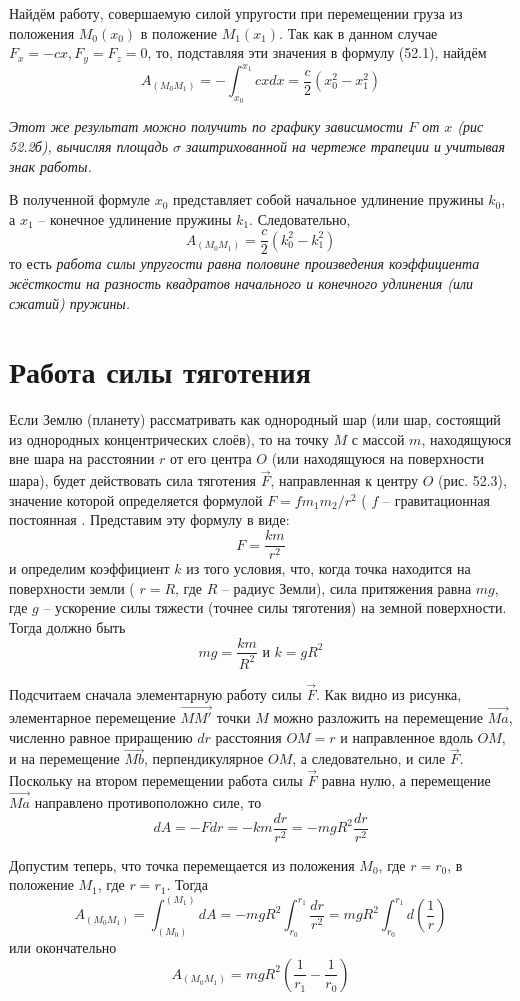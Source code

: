 Найдём работу, совершаемую силой упругости при перемещении груза из 
положения \( M_0(x_0) \) в положение \( M_1(x_1) \). Так как в данном 
случае \( F_x = -cx, F_y = F_z = 0 \), то, подставляя эти значения в 
формулу (52.1), найдём
\[ 
    A_{(M_0 M_1)} = - \int_{x_0}^{x_1} cxdx = 
    \frac{c}{2} \left( x^{2}_0 - x^{2}_1 \right) 
\]

\emph{Этот же результат можно получить по графику зависимости 
\( F \) от \( x \) (рис 52.2б), вычисляя площадь \( \sigma \) 
заштрихованной на чертеже трапеции и учитывая знак работы.}

В полученной формуле \( x_0 \) представляет собой начальное удлинение 
пружины \( k_0 \), а \( x_1 \) -- конечное удлинение пружины \( k_1 \). 
Следовательно, 
\[ A_{(M_0 M_1)} = \frac{c}{2} \left( k^{2}_0 - k^{2}_1 \right) \]
то есть \emph{работа силы упругости равна половине произведения 
коэффициента жёсткости на разность квадратов начального и конечного 
удлинения (или сжатий) пружины.}

\section{Работа силы тяготения}
Если Землю (планету) рассматривать как однородный шар (или шар, 
состоящий из однородных концентрических слоёв), то на точку \( M \) с 
массой \( m \), находящуюся вне шара на расстоянии \( r \) от его 
центра \( O \) (или находящуюся на поверхности шара), будет действовать 
сила тяготения \( \vec{F} \), направленная к центру \( O \) (рис. 52.3), 
значение которой определяется формулой \( F = fm_1 m_2 / r^2 \) 
( \( f \) -- гравитационная постоянная \). Представим эту формулу в виде: 
\[ F = \frac{km}{r^2} \]
и определим коэффициент \( k \) из того условия, что, когда точка 
находится на поверхности земли ( \( r = R \), где \( R \) -- радиус Земли), 
сила притяжения равна \( mg \), где \( g \) -- ускорение силы тяжести 
(точнее силы тяготения) на земной поверхности. Тогда должно быть
\[ mg = \frac{km}{R^2} \text{ и } k = gR^2 \]

Подсчитаем сначала элементарную работу силы \( \vec{F} \). Как видно из 
рисунка, элементарное перемещение \( \vec{MM'} \) точки \( M \) можно 
разложить на перемещение \( \vec{Ma} \), численно равное приращению 
\( dr \) расстояния \( OM = r \) и направленное вдоль \( OM \), и на 
перемещение \( \vec{Mb} \), перпендикулярное \( OM \), а следовательно, и 
силе \( \vec{F} \). Поскольку на втором перемещении работа силы 
\( \vec{F} \) равна нулю, а перемещение \( \vec{Ma} \) направлено 
противоположно силе, то 
\[ dA = -Fdr = -km\frac{dr}{r^2} = -mgR^2 \frac{dr}{r^2} \]

Допустим теперь, что точка перемещается из положения \( M_0 \), где 
\( r = r_0 \), в положение \( M_1 \), где \( r = r_1 \). Тогда 
\[ 
    A_{(M_0 M_1)} = \int_{(M_0)}^{(M_1)} dA = 
    -mgR^2 \int_{r_0}^{r_1} \frac{dr}{r^2} =
    mgR^2 \int_{r_0}^{r_1} d\left( \frac{1}{r} \right)
\]
или окончательно
\[ A_{(M_0 M_1)} = mgR^2 \left( \frac{1}{r_1} - \frac{1}{r_0} \right) \]

\newpage
